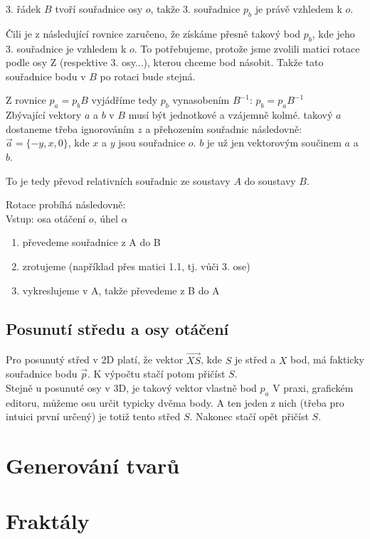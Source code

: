 \documentclass[a4paper,12pt]{book}
\begin{document}
3. řádek $B$ tvoří souřadnice osy $o$, takže 3. souřadnice $p_b$ je právě vzhledem k $o$.

Čili je z následující rovnice zaručeno, že získáme přesně takový bod $p_b$, kde jeho 3. souřadnice je vzhledem k $o$. To potřebujeme, protože jsme zvolili matici
rotace podle osy Z (respektive 3. osy...), kterou chceme bod násobit. Takže tato souřadnice bodu v $B$ po rotaci bude stejná.

Z rovnice $p_a = p_b B$ vyjádříme tedy $p_b$ vynasobením $B^{-1}$: $p_b = p_a B^{-1}$\\ %


Zbývající vektory $a$ a $b$ v $B$ musí být jednotkové a vzájemně kolmé. takový $a$ dostaneme třeba ignorováním $z$ a přehozením souřadnic následovně: $\vec{a} = \{-y, x, 0\}$, kde $x$ a $y$ jsou souřadnice $o$. $b$ je už jen vektorovým součinem $a$ a $b$.

To je tedy převod relativních souřadnic ze soustavy $A$ do soustavy $B$.




Rotace probíhá následovně:\\

Vstup: osa otáčení $o$, úhel $\alpha$

\begin{enumerate}[label=\arabic*, font=\bfseries] %
	\item převedeme souřadnice z A do B
	\item zrotujeme (například přes matici 1.1, tj. vůči 3. ose)
	\item vykreslujeme v A, takže převedeme z B do A
\end{enumerate}



\section{Posunutí středu a osy otáčení}

Pro posunutý střed v 2D platí, že vektor $\vec{XS}$, kde $S$ je střed a $X$ bod, má fakticky souřadnice bodu $\vec{p}$. K výpočtu stačí potom přičíst $S$.\\

Stejně u posunuté osy v 3D, je takový vektor vlastně bod $p_a$
V praxi, grafickém editoru, můžeme osu určit typicky dvěma body. A ten jeden z nich (třeba pro intuici první určený) je totiž tento střed $S$. Nakonec stačí opět přičíst $S$.


\chapter{Generování tvarů}








\chapter{Fraktály} %
\end{document}
